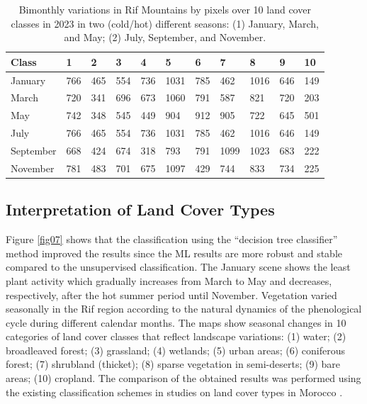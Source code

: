 \documentclass[geomatics,article,accept,pdftex,oneauthor]{Definitions/mdpi}
\begin{document}
\vspace{-5pt}
\begin{table}[H]
\caption{Bimonthly variations in Rif Mountains by pixels over 10 land cover classes in 2023 in two (cold/hot) different seasons: (1) January, March, and May; (2) July, September, and November.}
\begin{tabularx}{\textwidth}{p{1.5cm}XXX X X  X  XXX X  }
  \toprule
   \textbf{Class} & \textbf{1} & \textbf{2} & \textbf{3} & \textbf{4} & \textbf{5} & \textbf{6} & \textbf{7} & \textbf{8} & \textbf{9} & \textbf{10} \\
   \midrule
    January & 766 & 465 & 554 & 736 & 1031 & 785 & 462 & 1016 & 646 & 149 \\
    March & 720 & 341 & 696 & 673 & 1060 & 791 & 587 & 821 & 720 & 203 \\
    May & 742 & 348 & 545 & 449 & 904 & 912 & 905 & 722 & 645 & 501 \\
    July & 766 & 465 & 554 & 736 & 1031 & 785 & 462 & 1016 & 646 & 149 \\
    September & 668 & 424 & 674 & 318 & 793 & 791 & 1099 & 1023 & 683 & 222 \\
    November & 781 & 483 & 701 & 675 & 1097 & 429 & 744 & 833 & 734 & 225 \\
    \bottomrule
\end{tabularx}
\label{tab01}
\end{table}

\subsection{{Interpretation of Land Cover Types}}

Figure \ref{fig07} shows that the classification using the “decision tree classifier” method improved the results since the ML results are more robust and stable compared to the unsupervised classification. The January scene shows the least plant activity which gradually increases from March to May and decreases, respectively, after the hot summer period until November. {Vegetation} varied seasonally in the Rif region according to the natural dynamics of the phenological cycle during different calendar months. {The maps show seasonal changes in 10 categories of land cover classes that reflect landscape variations: (1) water; (2) broadleaved forest; (3) grassland; (4) wetlands; (5) urban areas; (6) coniferous forest; (7) shrubland (thicket); (8) sparse vegetation in semi-deserts; (9) bare areas; (10) cropland. }The comparison of the obtained results was performed using the existing classification schemes in studies on land cover types in Morocco \cite{Kusi,Hamdani,Kusi2023,Elfallah,Idoumskine}.
\end{document}
